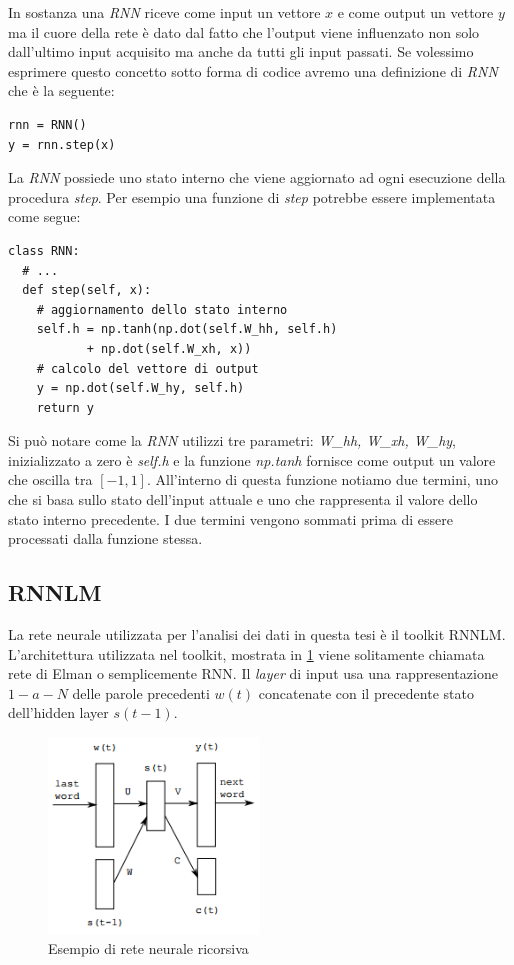 \documentclass[a4paper,12pt,openright,twoside]{report}
\theoremstyle{definition}
\begin{document}
In sostanza una \emph{RNN} riceve come input un vettore $x$ e come output un vettore $y$ ma il cuore della rete
è dato dal fatto che l'output viene influenzato non solo dall'ultimo input acquisito ma anche da tutti gli 
input passati. Se volessimo esprimere questo concetto sotto forma di codice avremo una definizione di \emph{RNN}
che è la seguente:
\begin{verbatim}
rnn = RNN()
y = rnn.step(x)
\end{verbatim}
La \emph{RNN} possiede uno stato interno che viene aggiornato ad ogni esecuzione della procedura \emph{step}.
Per esempio una funzione di \emph{step} potrebbe essere implementata come segue:
\begin{verbatim}
class RNN:
  # ...
  def step(self, x):
    # aggiornamento dello stato interno
    self.h = np.tanh(np.dot(self.W_hh, self.h) 
           + np.dot(self.W_xh, x))
    # calcolo del vettore di output
    y = np.dot(self.W_hy, self.h)
    return y
\end{verbatim}

Si può notare come la \emph{RNN} utilizzi tre parametri: \emph{W\_hh, W\_xh, W\_hy}, inizializzato a zero
è \emph{self.h} e la funzione \emph{np.tanh} fornisce come output un valore che oscilla tra $[-1,1]$.
All'interno di questa funzione notiamo due termini, uno che si basa sullo stato dell'input attuale e uno che 
rappresenta il valore dello stato interno precedente. I due termini vengono sommati prima di essere processati dalla 
funzione stessa.

\subsection{RNNLM}
La rete neurale utilizzata per l'analisi dei dati in questa tesi è il toolkit RNNLM. 
L'architettura utilizzata nel toolkit, mostrata in \ref{fig:rnnlm} viene solitamente chiamata rete di Elman o semplicemente RNN. 
Il \emph{layer} di input usa una rappresentazione $1-a-N$ delle 
parole precedenti $w(t)$ concatenate con il precedente stato dell'hidden layer $s(t - 1)$.
\begin{figure}[ht]
  \centering
      \includegraphics[width=0.5\textwidth]{Immagini/rnnlm_rete.png}
      \caption{Esempio di rete neurale ricorsiva}
\label{fig:rnnlm}
\end{figure}
\end{document}
